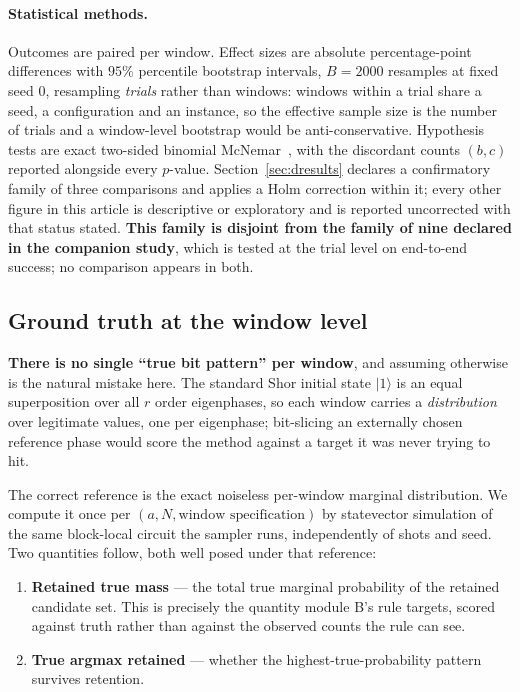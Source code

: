 \documentclass[final,5p,times,longtitle]{elsarticle}
\begin{document}
\paragraph{Statistical methods.} Outcomes are paired per window. Effect
sizes are absolute percentage-point differences with $95\%$ percentile
bootstrap intervals, $B=2000$ resamples at fixed seed $0$, resampling
\emph{trials} rather than windows: windows within a trial share a seed, a
configuration and an instance, so the effective sample size is the number
of trials and a window-level bootstrap would be anti-conservative.
Hypothesis tests are exact two-sided binomial McNemar~\cite{dietterich1998},
with the discordant counts $(b,c)$ reported alongside every $p$-value.
Section~\ref{sec:dresults} declares a confirmatory family of three
comparisons and applies a Holm correction within it; every other figure in
this article is descriptive or exploratory and is reported uncorrected with
that status stated. \textbf{This family is disjoint from the family of nine
declared in the companion study}, which is tested at the trial level on
end-to-end success; no comparison appears in both.

\subsection{Ground truth at the window level}
\label{sec:wdesign}

\textbf{There is no single ``true bit pattern'' per window}, and assuming
otherwise is the natural mistake here. The standard Shor initial state
$\lvert1\rangle$ is an equal superposition over all $r$ order eigenphases, so each
window carries a \emph{distribution} over legitimate values, one per
eigenphase; bit-slicing an externally chosen reference phase would score
the method against a target it was never trying to hit.

The correct reference is the exact noiseless per-window marginal
distribution. We compute it once per $(a,N,\text{window specification})$ by
statevector simulation of the same block-local circuit the sampler runs,
independently of shots and seed. Two quantities follow, both well posed
under that reference:

\begin{enumerate}\itemsep2pt
\item \textbf{Retained true mass} --- the total true marginal probability of
the retained candidate set. This is precisely the quantity module B's rule
targets, scored against truth rather than against the observed counts the
rule can see.
\item \textbf{True argmax retained} --- whether the highest-true-probability
pattern survives retention.
\end{enumerate}
\end{document}
